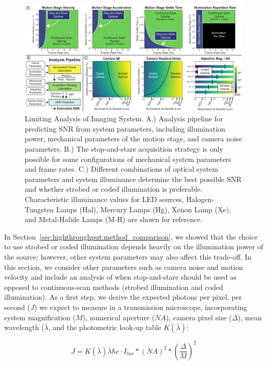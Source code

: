 \begin{figure}
  \centering
    \includegraphics[width=1.0\textwidth]{figures/fig_highthroughput_component_analysis.pdf}
      \caption{\label{fig:component_analysis} Limiting Analysis of Imaging System. A.) Analysis pipeline for predicting SNR from system parameters, including illumination power, mechanical parameters of the motion stage, and camera noise parameters. B.) The stop-and-stare acquisition strategy is only possible for some configurations of mechanical system parameters and frame rates. C.) Different combinations of optical system parameters and system illuminance determine the best possible SNR and whether strobed or coded illumination is preferable. Characteristic illuminance values for LED sources, Halogen-Tungsten Lamps (Hal), Mercury Lamps (Hg), Xenon Lamp (Xe), and Metal-Halide Lamps (M-H) are shown for reference. }
\end{figure}

In Section~\ref{sec:highthroughput:method_comparison}, we showed that the choice to use strobed or coded illumination depends heavily on the illumination power of the source; however, other system parameters may also affect this trade-off. In this section, we consider other parameters such as camera noise and motion velocity and include an analysis of when stop-and-stare should be used as opposed to continuous-scan methods (strobed illumination and coded illumination). As a first step, we derive the expected photons per pixel, per second ($J$) we expect to measure in a transmission microscope, incorporating system magnification ($M$), numerical aperture ($NA$), camera pixel size ($\Delta$), mean wavelength ($\bar{\lambda}$, and the photometric look-up table $K(\bar{\lambda})$:

\begin{equation}
\label{eq:photonflux}
J = K(\bar{\lambda}) \bar{\lambda}\hbar c \cdot I_{lux} * (NA)^2 * (\frac{\Delta}{M})^2
\end{equation}

